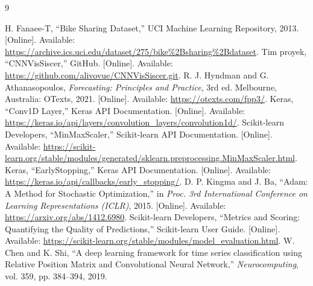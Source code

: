 \documentclass[10pt,conference]{IEEEtran}
\begin{document}
\begin{thebibliography}{9}
\raggedright
{} H. Fanaee-T, ``Bike Sharing Dataset,'' UCI Machine Learning Repository, 2013. [Online]. Available: \url{https://archive.ics.uci.edu/dataset/275/bike%2Bsharing%2Bdataset}.
 Tim proyek, ``CNNVisSiscer,'' GitHub. [Online]. Available: \url{https://github.com/alivovue/CNNVisSiscer.git}.
 R. J. Hyndman and G. Athanasopoulos, \textit{Forecasting: Principles and Practice}, 3rd ed. Melbourne, Australia: OTexts, 2021. [Online]. Available: \url{https://otexts.com/fpp3/}.
 Keras, ``Conv1D Layer,'' Keras API Documentation. [Online]. Available: \url{https://keras.io/api/layers/convolution_layers/convolution1d/}.
 Scikit-learn Developers, ``MinMaxScaler,'' Scikit-learn API Documentation. [Online]. Available: \url{https://scikit-learn.org/stable/modules/generated/sklearn.preprocessing.MinMaxScaler.html}.
 Keras, ``EarlyStopping,'' Keras API Documentation. [Online]. Available: \url{https://keras.io/api/callbacks/early_stopping/}.
 D. P. Kingma and J. Ba, ``Adam: A Method for Stochastic Optimization,'' in \textit{Proc. 3rd International Conference on Learning Representations (ICLR)}, 2015. [Online]. Available: \url{https://arxiv.org/abs/1412.6980}.
 Scikit-learn Developers, ``Metrics and Scoring: Quantifying the Quality of Predictions,'' Scikit-learn User Guide. [Online]. Available: \url{https://scikit-learn.org/stable/modules/model_evaluation.html}.
 W. Chen and K. Shi, ``A deep learning framework for time series classification using Relative Position Matrix and Convolutional Neural Network,'' \textit{Neurocomputing}, vol. 359, pp. 384--394, 2019.
\end{thebibliography}
\end{document}

